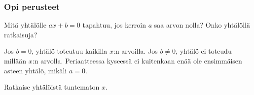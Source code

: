 \begin{tehtavasivu}


\subsubsection*{Opi perusteet}

\begin{tehtava}
Mitä yhtälölle $ax+b = 0$ tapahtuu, jos kerroin $a$ saa arvon nolla? Onko yhtälöllä ratkaisuja?
\begin{vastaus}
Jos $b = 0$, yhtälö toteutuu kaikilla $x$:n arvoilla. Jos $b \neq 0$, yhtälö ei toteudu millään $x$:n arvolla. Periaatteessa kyseessä ei kuitenkaan enää ole ensimmäisen asteen yhtälö, mikäli $a = 0$.
\end{vastaus}
\end{tehtava}

\begin{tehtava}
Ratkaise yhtälöistä tuntematon $x$.

\begin{alakohdat}
\end{alakohdat}
\begin{vastaus}
\begin{alakohdat}
\end{alakohdat}
\end{vastaus}
\end{tehtava}

\begin{tehtava}
\begin{alakohdat}
\end{alakohdat}
\begin{vastaus}
\begin{alakohdat}
\end{alakohdat}
\end{vastaus}
\end{tehtava}


\end{tehtavasivu}
